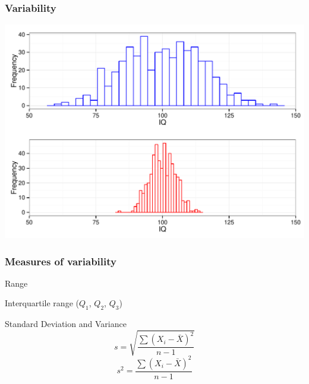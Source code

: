 \documentclass[dvipsnames]{beamer}\usepackage[]{graphicx}\usepackage[]{color}
\makeatletter
\def\maxwidth{ %
  \ifdim\Gin@nat@width>\linewidth
    \linewidth
  \else
    \Gin@nat@width
  \fi
}
\newenvironment{knitrout}{}{} %
\makeatother
\begin{document}
\begin{frame}
\frametitle{Variability}
\begin{knitrout}
\color{fgcolor}

{\centering \includegraphics[width=\maxwidth]{figure/unnamed-chunk-7-1} 

}



\end{knitrout}
\end{frame}

\begin{frame}
\frametitle{Measures of variability}

Range

\vspace{.5cm}

Interquartile range ($Q_1$, $Q_2$, $Q_3$)

\vspace{.5cm}

Standard Deviation and Variance
$$
s = \sqrt{\frac{\sum{(X_i - \bar{X})^2}}{n - 1}}
$$
$$
s^2 = \frac{\sum{(X_i - \bar{X})^2}}{n - 1}
$$
\end{frame}
\end{document}
